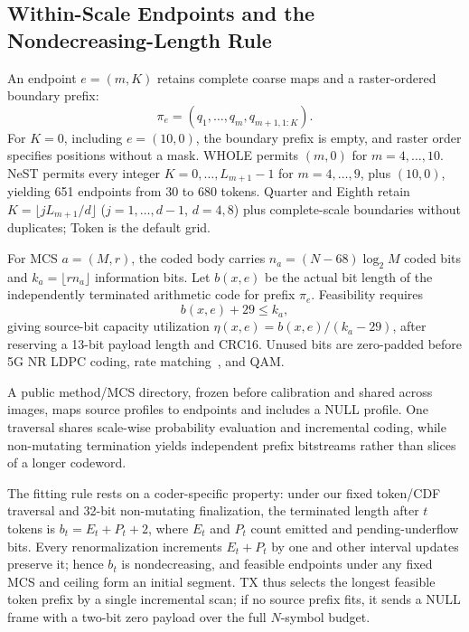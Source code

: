 \subsection{Within-Scale Endpoints and the Nondecreasing-Length Rule}
An endpoint $e=(m,K)$ retains complete coarse maps and a raster-ordered boundary prefix:
\begin{equation}
\pi_e=(q_1,\ldots,q_m,q_{m+1,1:K}).
\label{eq:prefix}
\end{equation}
For $K=0$, including $e=(10,0)$, the boundary prefix is empty, and raster order specifies positions without a mask. WHOLE permits $(m,0)$ for $m=4,\ldots,10$. NeST permits every integer $K=0,\ldots,L_{m+1}-1$ for $m=4,\ldots,9$, plus $(10,0)$, yielding 651 endpoints from 30 to 680 tokens. Quarter and Eighth retain $K=\lfloor jL_{m+1}/d\rfloor$ ($j=1,\ldots,d-1$, $d=4,8$) plus complete-scale boundaries without duplicates; Token is the default grid.

For MCS $a=(M,r)$, the coded body carries $n_a=(N-68)\log_2M$ coded bits and $k_a=\lfloor rn_a\rfloor$ information bits. Let $b(x,e)$ be the actual bit length of the independently terminated arithmetic code for prefix $\pi_e$. Feasibility requires
\begin{equation}
b(x,e)+29\leq k_a,
\label{eq:budget}
\end{equation}
giving source-bit capacity utilization $\eta(x,e)=b(x,e)/(k_a-29)$, after reserving a 13-bit payload length and CRC16. Unused bits are zero-padded before 5G NR LDPC coding, rate matching~\cite{nr}, and QAM.

A public method/MCS directory, frozen before calibration and shared across images, maps source profiles to endpoints and includes a NULL profile. One traversal shares scale-wise probability evaluation and incremental coding, while non-mutating termination yields independent prefix bitstreams rather than slices of a longer codeword.

The fitting rule rests on a coder-specific property: under our fixed token/CDF traversal and 32-bit non-mutating finalization, the terminated length after $t$ tokens is $b_t=E_t+P_t+2$, where $E_t$ and $P_t$ count emitted and pending-underflow bits. Every renormalization increments $E_t+P_t$ by one and other interval updates preserve it; hence $b_t$ is nondecreasing, and feasible endpoints under any fixed MCS and ceiling form an initial segment. TX thus selects the longest feasible token prefix by a single incremental scan; if no source prefix fits, it sends a NULL frame with a two-bit zero payload over the full $N$-symbol budget.

